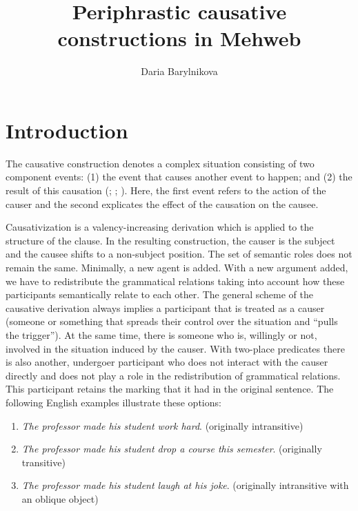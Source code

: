 ﻿\documentclass[output=paper]{langsci/langscibook}
\title{Periphrastic causative constructions in Mehweb}
\author{Daria Barylnikova\affiliation{National Research University Higher School of Economics}}
\begin{document}
\maketitle


\let\exfont\rm
\let\eachwordone\rm


\section{Introduction}

The causative construction denotes a
complex situation consisting of two component events: (1) the event that
causes another event to happen; and (2) the result of this causation
(\citealt[165–166]{comrie1989}; \citealt{nedjalkov-silnitsky1973}; \citealt{kulikov2001}).
Here, the first event refers to the action of the causer and the
second explicates the effect of the causation on the causee.

Causativization is a valency-increasing derivation which is applied to
the structure of the clause. In the resulting construction, the causer
is the subject and the causee shifts to a non-subject position. The set
of semantic roles does not remain the same. Minimally, a new agent is
added. With a new argument added, we have to redistribute the
grammatical relations taking into account how these participants
semantically relate to each other. The general scheme of the causative
derivation always implies a participant that is treated as a causer
(someone or something that spreads their control over the
situation and ``pulls the trigger''). At the same time, there is someone
who is, willingly or not, involved in the situation induced by the
causer. With two-place predicates there is also another, undergoer
participant who does not interact with the causer directly and does not
play a role in the redistribution of grammatical relations. This
participant retains the marking that it had in the original sentence.
The following English examples illustrate these options:

\begin{enumerate}[label=\alph{enumi}.,topsep=\medskipamount,itemsep=0pt,partopsep=0pt,parsep=0pt]
\item
  \emph{The professor made his student work hard}. (originally
  intransitive)

\item %
  \emph{The professor made his student drop a course this semester}.
  (originally transitive)

\item  %
  \emph{The professor made his student laugh at his joke}. (originally
  intransitive with an oblique object)
\end{enumerate}
\end{document}
